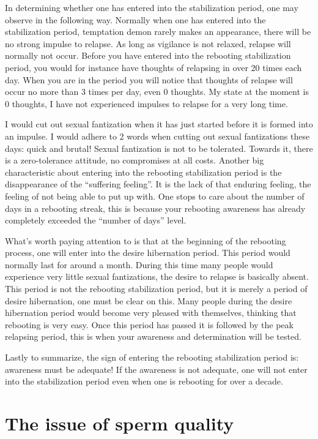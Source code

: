 \documentclass[
]{book}
\begin{document}
In determining whether one has entered into the stabilization period, one may observe in the following way. Normally when one has entered into the stabilization period, temptation demon rarely makes an appearance, there will be no strong impulse to relapse. As long as vigilance is not relaxed, relapse will normally not occur. Before you have entered into the rebooting stabilization period, you would for instance have thoughts of relapsing in over 20 times each day. When you are in the period you will notice that thoughts of relapse will occur no more than 3 times per day, even 0 thoughts. My state at the moment is 0 thoughts, I have not experienced impulses to relapse for a very long time.

I would cut out sexual fantization when it has just started before it is formed into an impulse. I would adhere to 2 words when cutting out sexual fantizations these days: quick and brutal! Sexual fantization is not to be tolerated. Towards it, there is a zero-tolerance attitude, no compromises at all costs. Another big characteristic about entering into the rebooting stabilization period is the disappearance of the ``suffering feeling''. It is the lack of that enduring feeling, the feeling of not being able to put up with. One stops to care about the number of days in a rebooting streak, this is because your rebooting awareness has already completely exceeded the ``number of days'' level.

What's worth paying attention to is that at the beginning of the rebooting process, one will enter into the desire hibernation period. This period would normally last for around a month. During this time many people would experience very little sexual fantizations, the desire to relapse is basically absent. This period is not the rebooting stabilization period, but it is merely a period of desire hibernation, one must be clear on this. Many people during the desire hibernation period would become very pleased with themselves, thinking that rebooting is very easy. Once this period has passed it is followed by the peak relapsing period, this is when your awareness and determination will be tested.

Lastly to summarize, the sign of entering the rebooting stabilization period is: awareness must be adequate! If the awareness is not adequate, one will not enter into the stabilization period even when one is rebooting for over a decade.

\hypertarget{the-issue-of-sperm-quality}{%
\section{The issue of sperm quality}\label{the-issue-of-sperm-quality}}
\end{document}
